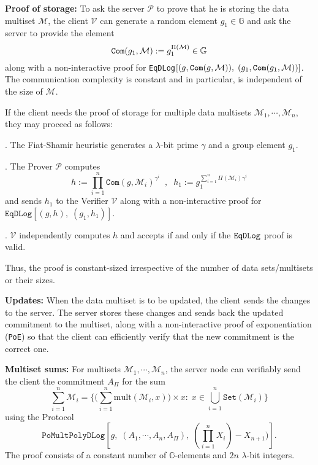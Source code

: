 \documentclass[11pt, lettersize, notitlepage, leqno, footskip=0.6cm]{article}
\newcommand{\pl}{\prod\limits}
\newcommand{\slim}{\sum\limits}
\newcommand{\ttt}{\texttt}
\newcommand{\sett}{\ttt{Set}}
\newcommand{\mul}{\mr{mult}}
\newcommand{\mc}{\mathcal}
\newcommand{\mb}{\mathbb}
\newcommand{\mr}{\mathrm}
\newcommand{\lam}{\lambda}
\newcommand{\mP}{\mc{P}}
\newcommand{\V}{\mc{V}}
\newcommand{\mcM}{\mc{M}}
\newcommand{\vs}{\vspace{-0.15cm}}
\newcommand{\noin}{\noindent}
\numberwithin{equation}{section}
\begin{document}
\noin \textbf{Proof of storage:} To ask the server $\mP$ to prove that he is storing the data multiset $\mc{M}$, the client $\V$ can generate a random element $g_1\in\mb{G}$ and ask the server to provide the element \vs $$\protect{\verb|Com|}(g_1, \mc{M}):= g_1^{\Pi(\mc{M})}\in\mb{G}$$ along with a non-interactive proof for \verb|EqDLog|$[(g, \protect{\verb|Com|}(g, \mc{M})),\;(g_1, \protect{\verb|Com|}(g_1, \mc{M}))]$. The communication complexity is constant and in particular, is independent of the size of $\mc{M}$.

If the client needs the proof of storage for multiple data multisets $\mc{M}_1,\cdots,\mc{M}_n$, they may proceed as follows: \vspace{0.1cm}

\noin 1. The Fiat-Shamir heuristic generates a $\lam$-bit prime $\gamma$ and a group element $g_1$.

\noin 2. The Prover $\mP$ computes \vs $$h:= \pl_{i=1}^n \ttt{Com}(g, \mcM_i)^{\gamma^i}\;\;,\;\;h_1:= g_1^{\slim_{i=1}^n \Pi(\mcM_i)\gamma^i}$$ and sends $h_1$ to the Verifier $\V$ along with a non-interactive proof for $\ttt{EqDLog}[(g,h),\;(g_1,h_1)]$.

\noin 3. $\V$ independently computes $h$ and accepts if and only if the $\tt{EqDLog}$ proof is valid.\vspace{0.1cm}


\noin Thus, the proof is constant-sized irrespective of the number of data sets/multisets or their sizes.



\vspace{0.2cm}

\noin \textbf{Updates:} When the data multiset is to be updated, the client sends the changes to the server. The server stores these changes and sends back the updated commitment to the multiset, along with a non-interactive proof of exponentiation (\verb|PoE|) so that the client can efficiently verify that the new commitment is the correct one. \vspace{0.15cm}

\noin \textbf{Multiset sums:} For multisets $\mc{M}_1,\cdots,\mc{M}_n$, the server node can verifiably send the client the commitment $A_{\Pi}$ for the sum \vs $$\sum\limits_{i=1}^n \mc{M}_i = \Big\{\big(\sum\limits_{i=1}^n \mul(\mc{M}_i, x)\big)\times x:\; x\in\bigcup\limits_{i=1}^n \sett(\mc{M}_i)\Big\} $$ using the Protocol \vs $$\ttt{PoMultPolyDLog}[g,\; (A_1,\cdots,A_n,A_{\Pi}),\;(\pl_{i=1}^{n}X_i)-X_{n+1})].$$ The proof consists of a constant number of $\mb{G}$-elements and $2n$ $\lam$-bit integers.
\end{document}

